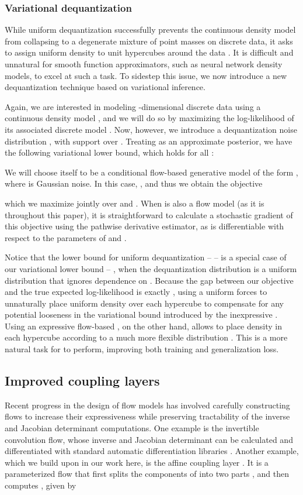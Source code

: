 \documentclass{article}
\begin{document}
\subsubsection{Variational dequantization}
\label{sec:variationaldequant}
While uniform dequantization successfully prevents the continuous density model  from collapsing to a degenerate mixture of point masses on discrete data, it asks  to assign uniform density to unit hypercubes  around the data . It is difficult and unnatural for smooth function approximators, such as neural network density models, to excel at such a task. To sidestep this issue, we now introduce a new dequantization technique based on variational inference.

Again, we are interested in modeling -dimensional discrete data  using a continuous density model , and we will do so by maximizing the log-likelihood of its associated discrete model . Now, however, we introduce a dequantization noise distribution , with support over . Treating  as an approximate posterior, we have the following variational lower bound, which holds for all :

We will choose  itself to be a conditional flow-based generative model of the form , where  is Gaussian noise. In this case, , and thus we obtain the objective

which we maximize jointly over  and . When  is also a flow model  (as it is throughout this paper), it is straightforward to calculate a stochastic gradient of this objective using the pathwise derivative estimator, as  is differentiable with respect to the parameters of  and .

Notice that the lower bound for uniform dequantization --   -- is a special case of our variational lower bound -- , when the dequantization distribution  is a uniform distribution that ignores dependence on . Because the gap between our objective  and the true expected log-likelihood  is exactly , using a uniform  forces  to unnaturally place uniform density over each hypercube  to compensate for any potential looseness in the variational bound introduced by the inexpressive . Using an expressive flow-based , on the other hand, allows  to place density in each hypercube  according to a much more flexible distribution . This is a more natural task for  to perform, improving both training and generalization loss.

\subsection{Improved coupling layers}
Recent progress in the design of flow models has involved carefully constructing flows to increase their expressiveness while preserving tractability of the inverse and Jacobian determinant computations. One example is the invertible  convolution flow, whose inverse and Jacobian determinant can be calculated and differentiated with standard automatic differentiation libraries \citep{kingma2018glow}. Another example, which we build upon in our work here, is the affine coupling layer \citep{dinh2016density}. It is a parameterized flow  that first splits the components of  into two parts , and then computes , given by
\end{document}
